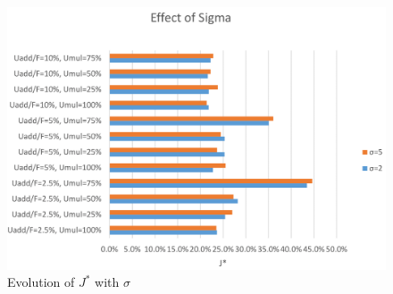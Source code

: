 \begin{figure}
	\label{fig:sigma}
	\caption{Evolution of $J^{*}$ with $\sigma$}
	\includegraphics[width=7in]{figures/sigma.png}
\end{figure}